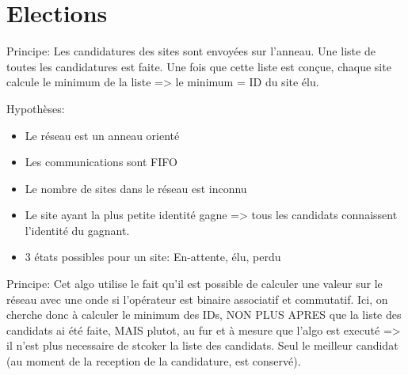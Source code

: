 \documentclass[a4paper,11pt]{article}
\begin{document}
\section{Elections}

Principe: Les candidatures des sites sont envoyées sur l'anneau. Une liste de toutes les candidatures est faite. Une fois que cette liste est conçue, chaque site calcule le minimum de la liste => le minimum = ID du site élu.

Hypothèses:
\begin{itemize}
    \item Le réseau est un anneau orienté
    \item Les communications sont FIFO
    \item Le nombre de sites dans le réseau est inconnu
    \item Le site ayant la plus petite identité gagne => tous les candidats connaissent l'identité du gagnant.
    \item 3 états possibles pour un site: En-attente, élu, perdu
\end{itemize}


\newpage

Principe: Cet algo utilise le fait qu'il est possible de calculer une valeur sur le réseau avec une onde si l'opérateur est binaire associatif et commutatif. Ici, on cherche donc à calculer le minimum des IDs, NON PLUS APRES que la liste des candidats ai été faite, MAIS plutot, au fur et à mesure que l'algo est executé => il n'est plus necessaire de stcoker la liste des candidats. Seul le meilleur candidat (au moment de la reception de la candidature, est conservé).
\end{document}
